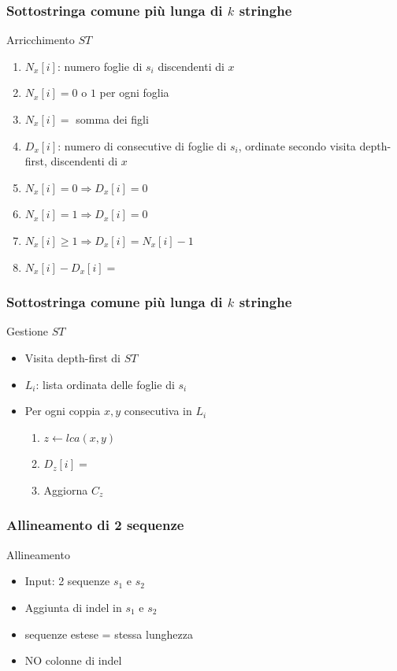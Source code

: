\begin{frame}[fragile]
\frametitle{Sottostringa comune più lunga di $k$ stringhe}
\begin{block}{Arricchimento $ST$}
\begin{enumerate}[<+->]
\item
$N_{x}[i]$: numero foglie di $s_{i}$ discendenti di $x$
\item
$N_{x}[i]=0$ o $1$ per ogni foglia
\item
$N_{x}[i]=$ somma dei figli
\item
$D_{x}[i]$: numero di consecutive di foglie di $s_{i}$, ordinate secondo visita depth-first, discendenti di $x$
\item
$N_{x}[i]=0 \Rightarrow D_{x}[i]=0$
\item
$N_{x}[i]=1 \Rightarrow D_{x}[i]=0$
\item
$N_{x}[i]\ge 1 \Rightarrow D_{x}[i]=N_{x}[i]-1$
\item
$N_{x}[i] - D_{x}[i] =$ 
\end{enumerate}
\end{block}
\end{frame}

\begin{frame}[fragile]
\frametitle{Sottostringa comune più lunga di $k$ stringhe}
\begin{block}{Gestione $ST$}
\begin{itemize}
\item
Visita depth-first di $ST$
\item
$L_{i}$: lista ordinata delle foglie di $s_{i}$
\item
Per ogni coppia $x,y$ consecutiva in $L_{i}$
\begin{enumerate}
\item
$z\gets lca(x,y)$
\item
$D_{z}[i]=$
\item
Aggiorna $C_{z}$
\end{enumerate}
\end{itemize}
\end{block}
\end{frame}

\begin{frame}[fragile]
\frametitle{Allineamento di 2 sequenze}
\begin{block}{Allineamento}
\begin{itemize}
\item
Input: 2 sequenze $s_{1}$ e $s_{2}$
\item
Aggiunta di \alert{indel} in $s_{1}$ e $s_{2}$
\item
sequenze estese = stessa lunghezza
\item
NO colonne di indel
\end{itemize}
\end{block}
\end{frame}

